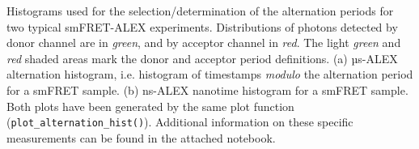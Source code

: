 \label{fig:altern_hist_double} 
Histograms used for the selection/determination of the alternation periods for two typical smFRET-ALEX experiments.
Distributions of photons detected by donor channel are in \textit{green}, and by acceptor channel in \textit{red}.
The light \textit{green} and \textit{red} shaded areas mark the donor and acceptor period definitions.
(a) µs-ALEX alternation histogram, i.e. histogram of timestamps \textit{modulo} the alternation period for a smFRET sample. 
(b) ns-ALEX nanotime histogram for a smFRET sample. 
Both plots have been generated by the same plot function (\texttt{plot\_alternation\_hist()}). 
Additional information on these specific measurements can be found in the  attached notebook.